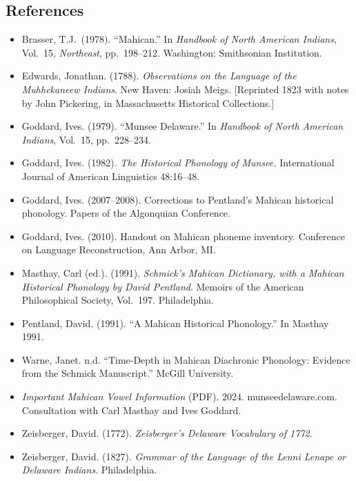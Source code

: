 \subsection{References}

\begin{itemize}
  \item Brasser, T.J.\ (1978). ``Mahican.'' In \emph{Handbook of North
    American Indians}, Vol.\ 15, \emph{Northeast}, pp.\ 198--212. Washington:
    Smithsonian Institution.
  \item Edwards, Jonathan. (1788). \emph{Observations on the Language of the
    Muhhekaneew Indians}. New Haven: Josiah Meigs. [Reprinted 1823 with notes
    by John Pickering, in Massachusetts Historical Collections.]
  \item Goddard, Ives. (1979). ``Munsee Delaware.'' In \emph{Handbook of
    North American Indians}, Vol.\ 15, pp.\ 228--234.
  \item Goddard, Ives. (1982). \emph{The Historical Phonology of Munsee.}
    International Journal of American Linguistics 48:16--48.
  \item Goddard, Ives. (2007--2008). Corrections to Pentland's Mahican
    historical phonology. Papers of the Algonquian Conference.
  \item Goddard, Ives. (2010). Handout on Mahican phoneme inventory.
    Conference on Language Reconstruction, Ann Arbor, MI.
  \item Masthay, Carl (ed.). (1991). \emph{Schmick's Mahican Dictionary,
    with a Mahican Historical Phonology by David Pentland}. Memoirs of the
    American Philosophical Society, Vol.\ 197. Philadelphia.
  \item Pentland, David. (1991). ``A Mahican Historical Phonology.'' In
    Masthay 1991.
  \item Warne, Janet. n.d. ``Time-Depth in Mahican Diachronic Phonology:
    Evidence from the Schmick Manuscript.'' McGill University.
  \item \emph{Important Mahican Vowel Information} (PDF). 2024.
    munseedelaware.com. Consultation with Carl Masthay and Ives Goddard.
  \item Zeisberger, David. (1772). \emph{Zeisberger's Delaware Vocabulary of
    1772}.
  \item Zeisberger, David. (1827). \emph{Grammar of the Language of the
    Lenni Lenape or Delaware Indians}. Philadelphia.
\end{itemize}

